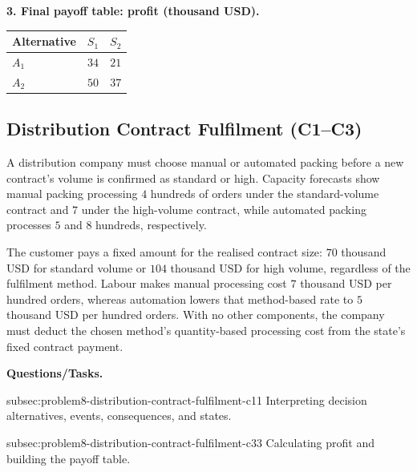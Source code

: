 \noindent\begin{minipage}{\linewidth}
\textbf{3. Final payoff table: profit (thousand USD).}
\begin{center}
\begin{tabular}{@{}lcc@{}}
\toprule
Alternative & \(S_1\) & \(S_2\) \\
\midrule
\(A_1\) & \(34\) & \(21\) \\
\(A_2\) & \(50\) & \(37\) \\
\bottomrule
\end{tabular}
\end{center}
\end{minipage}




	\subsection{Distribution Contract Fulfilment (C1--C3)}
	\label{sec:problem8-distribution-contract-fulfilment-c1-c3}

	A distribution company must choose manual or automated packing before a new contract's volume is confirmed as standard or high. Capacity forecasts show manual packing processing \(4\) hundreds of orders under the standard-volume contract and \(7\) under the high-volume contract, while automated packing processes \(5\) and \(8\) hundreds, respectively.

	The customer pays a fixed amount for the realised contract size: \(70\) thousand USD for standard volume or \(104\) thousand USD for high volume, regardless of the fulfilment method. Labour makes manual processing cost \(7\) thousand USD per hundred orders, whereas automation lowers that method-based rate to \(5\) thousand USD per hundred orders. With no other components, the company must deduct the chosen method's quantity-based processing cost from the state's fixed contract payment.

	\textbf{Questions/Tasks.}
	\begin{enumerate}
		\CriterionTask
		{subsec:problem8-distribution-contract-fulfilment-c1}{1}
		{Interpreting decision alternatives, events, consequences, and states.}

		\CriterionTask
		{subsec:problem8-distribution-contract-fulfilment-c3}{3}
		{Calculating profit and building the payoff table.}
	\end{enumerate}

